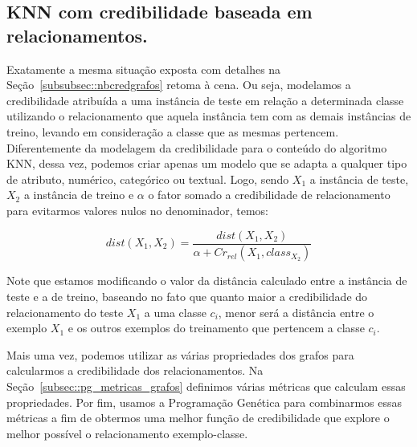 \subsection{\textsc{KNN} com credibilidade baseada em relacionamentos.}
\label{subsubsec::knncredgrafos}

Exatamente a mesma situação exposta com detalhes na Seção~\ref{subsubsec::nbcredgrafos} retoma à cena. Ou seja, modelamos a credibilidade atribuída a uma instância de teste em relação a determinada classe utilizando o relacionamento que aquela instância tem com as demais instâncias de treino, levando em consideração a classe que as mesmas pertencem. Diferentemente da modelagem da credibilidade para o conteúdo do algoritmo \textsc{KNN}, dessa vez, podemos criar apenas um modelo que se adapta a qualquer tipo de atributo, numérico, categórico ou textual. Logo, sendo $X_1$ a instância de teste, $X_2$ a instância de treino e $\alpha$ o fator somado a credibilidade de relacionamento para evitarmos valores nulos no denominador, temos:

\begin{equation}\label{eqn::distancia_grafos}
    dist(X_1, X_2) = \frac{ dist(X_1, X_2) } { \alpha + Cr_{rel}(X_1, class_{X_2}) }
\end{equation}

Note que estamos modificando o valor da distância calculado entre a instância de teste e a de treino, baseando no fato que quanto maior a credibilidade do relacionamento do teste $X_1$ a uma classe $c_i$, menor será a distância entre o exemplo $X_1$ e os outros exemplos do treinamento que pertencem a classe $c_i$.

Mais uma vez, podemos utilizar as várias propriedades dos grafos para calcularmos a credibilidade dos relacionamentos. Na Seção~\ref{subsec::pg_metricas_grafos} definimos várias métricas que calculam essas propriedades. Por fim, usamos a Programação Genética para combinarmos essas métricas a fim de obtermos uma melhor função de credibilidade que explore o melhor possível o relacionamento exemplo-classe.

